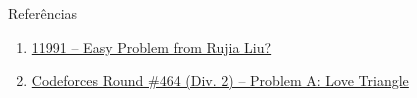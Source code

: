 \begin{frame}[fragile]{Referências}

    \begin{enumerate}
        \item \href{https://uva.onlinejudge.org/index.php?option=com_onlinejudge&Itemid=8&category=24&page=show_problem&problem=3142}{11991 -- Easy Problem from Rujia Liu?}

        \item \href{https://codeforces.com/problemset/problem/939/A}{Codeforces Round \#464 (Div. 2) -- Problem A: Love Triangle}

    \end{enumerate}

\end{frame}
